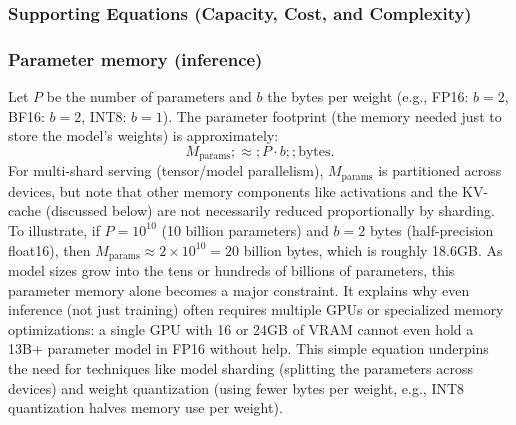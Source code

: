 \subsubsection{Supporting Equations (Capacity, Cost, and Complexity)}
\label{sec:ch2-supporting-equations}


\subsubsection{Parameter memory (inference)}
Let $P$ be the number of parameters and $b$ the bytes per weight (e.g., FP16: $b{=}2$, BF16: $b{=}2$, INT8: $b{=}1$). The parameter footprint (the memory needed just to store the model's weights) is approximately:
\begin{equation}
\label{eq:param-mem}
M_{\text{params}} ;\approx; P \cdot b ;; \text{bytes}.
\end{equation}
For multi-shard serving (tensor/model parallelism), $M_{\text{params}}$ is partitioned across devices, but note that other memory components like activations and the KV-cache (discussed below) are not necessarily reduced proportionally by sharding. To illustrate, if $P = 10^{10}$ (10 billion parameters) and $b = 2$ bytes (half-precision float16), then $M_{\text{params}} \approx 2 \times 10^{10} = 20$ billion bytes, which is roughly 18.6GB. As model sizes grow into the tens or hundreds of billions of parameters, this parameter memory alone becomes a major constraint. It explains why even inference (not just training) often requires multiple GPUs or specialized memory optimizations: a single GPU with 16 or 24GB of VRAM cannot even hold a 13B+ parameter model in FP16 without help. This simple equation underpins the need for techniques like model sharding (splitting the parameters across devices) and weight quantization (using fewer bytes per weight, e.g., INT8 quantization halves memory use per weight).

